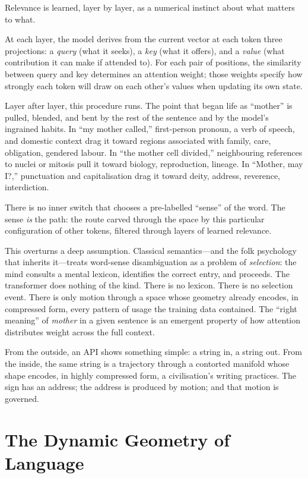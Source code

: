 Relevance is learned, layer by layer, as a numerical instinct about what matters to what.

At each layer, the model derives from the current vector at each token three projections: a \emph{query} (what it seeks), a \emph{key} (what it offers), and a \emph{value} (what contribution it can make if attended to). For each pair of positions, the similarity between query and key determines an attention weight; those weights specify how strongly each token will draw on each other's values when updating its own state.

Layer after layer, this procedure runs. The point that began life as ``mother'' is pulled, blended, and bent by the rest of the sentence and by the model's ingrained habits. In ``my mother called,'' first-person pronoun, a verb of speech, and domestic context drag it toward regions associated with family, care, obligation, gendered labour. In ``the mother cell divided,'' neighbouring references to nuclei or mitosis pull it toward biology, reproduction, lineage. In ``Mother, may I?,'' punctuation and capitalisation drag it toward deity, address, reverence, interdiction.

There is no inner switch that chooses a pre-labelled ``sense'' of the word. The sense \emph{is} the path: the route carved through the space by this particular configuration of other tokens, filtered through layers of learned relevance.

This overturns a deep assumption. Classical semantics---and the folk psychology that inherits it---treats word-sense disambiguation as a problem of \emph{selection}: the mind consults a mental lexicon, identifies the correct entry, and proceeds. The transformer does nothing of the kind. There is no lexicon. There is no selection event. There is only motion through a space whose geometry already encodes, in compressed form, every pattern of usage the training data contained. The ``right meaning'' of \emph{mother} in a given sentence is an emergent property of how attention distributes weight across the full context.

From the outside, an API shows something simple: a string in, a string out. From the inside, the same string is a trajectory through a contorted manifold whose shape encodes, in highly compressed form, a civilisation's writing practices. The sign has an address; the address is produced by motion; and that motion is governed.


\section{The Dynamic Geometry of Language}

